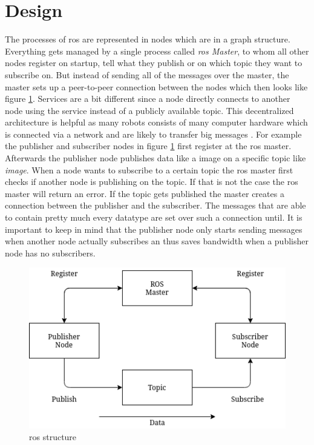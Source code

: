 \section{Design}
The processes of \gls{ros} are represented in nodes which are in a graph structure. Everything gets managed by a single process called \textit{\gls{ros} Master}, to whom all other nodes register on startup, tell what they publish or on which topic they want to subscribe on. But instead of sending all of the messages over the master, the master sets up a peer-to-peer connection between the nodes which then looks like figure \ref{rosstructure}. Services are a bit different since a node directly connects to another node using the service instead of a publicly available topic. This decentralized architecture is helpful as many robots consists of many computer hardware which is connected via a network and are likely to transfer big messages \cite{rosoneoone}.\newline
For example the publisher and subscriber nodes in figure \ref{rosstructure} first register at the \gls{ros} master. Afterwards the publisher node publishes data like a image on a specific topic like \textit{image}. When a node wants to subscribe to a certain topic the \gls{ros} master first checks if another node is publishing on the topic. If that is not the case the \gls{ros} master will return an error. If the topic gets published the master creates a connection between the publisher and the subscriber. The messages that are able to contain pretty much every datatype are set over such a connection until. It is important to keep in mind that the publisher node only starts sending messages when another node actually subscribes an thus saves bandwidth when a publisher node has no subscribers.\newline
\begin{figure}[h]
	\centering
	\includegraphics[height=0.5\textwidth]{./media/images/rosstructure.png}
  	\caption{\gls{ros} structure}
  	\label{rosstructure}
\end{figure}

